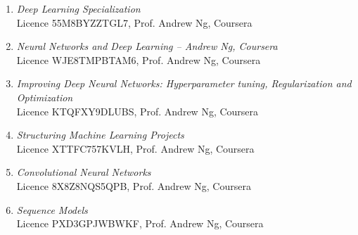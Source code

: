 \begin{courses}
    \begin{enumerate}[leftmargin=0.45cm, itemsep=0em, topsep=0.5em, parsep=0.2em]
        \item \emph{Deep Learning Specialization}\\
        Licence 55M8BYZZTGL7, Prof. Andrew Ng, Coursera
        \item \emph{Neural Networks and Deep Learning – Andrew Ng, Coursera}\\
        Licence WJE8TMPBTAM6, Prof. Andrew Ng, Coursera
        \item \emph{Improving Deep Neural Networks: Hyperparameter tuning, Regularization and Optimization} \\
        Licence KTQFXY9DLUBS, Prof. Andrew Ng, Coursera
        \item \emph{Structuring Machine Learning Projects} \\
        Licence XTTFC757KVLH, Prof. Andrew Ng, Coursera
        \item \emph{Convolutional Neural Networks}\\
        Licence 8X8Z8NQS5QPB, Prof. Andrew Ng, Coursera
        \item \emph{Sequence Models}\\
        Licence PXD3GPJWBWKF, Prof. Andrew Ng, Coursera
    \end{enumerate}
\end{courses}